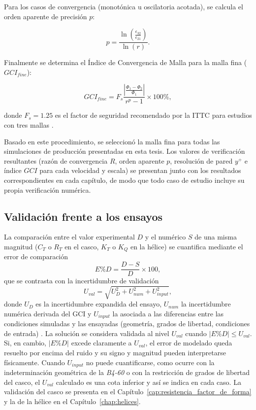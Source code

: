Para los casos de convergencia (monotónica u oscilatoria acotada), se calcula el orden aparente de precisión $p$:

\begin{equation}
    p = \frac{\ln \left( \frac{\epsilon_{32}}{\epsilon_{21}} \right)}{\ln(r)}.
\end{equation}

Finalmente se determina el Índice de Convergencia de Malla para la malla fina ($GCI_{fine}$):

\begin{equation}
    GCI_{fine} = F_s \frac{ \left| \frac{\Phi_{1} - \Phi_{2}}{\Phi_{1}} \right| }{r^p - 1} \times 100 \%,
\end{equation}

donde $F_s = 1.25$ es el factor de seguridad recomendado por la ITTC
para estudios con tres mallas \citep{ITTC_uncertainty_CFD}.

Basado en este procedimiento, se seleccionó la malla fina para todas
las simulaciones de producción presentadas en esta tesis. Los valores de
verificación resultantes (razón de convergencia $R$, orden aparente $p$,
resolución de pared $y^+$ e índice $GCI$ para cada velocidad y escala) se
presentan junto con los resultados correspondientes en cada capítulo, de modo
que todo caso de estudio incluye su propia verificación numérica.

\subsection{Validación frente a los ensayos}
\label{sec:validacion_general}

La comparación entre el valor experimental $D$ y el numérico $S$ de una misma magnitud ($C_T$ o $R_T$ en el casco, $K_T$ o $K_Q$ en la hélice) se cuantifica mediante el error de comparación
%
\begin{equation}
    E\%D = \frac{D - S}{D}\times 100,
    \label{eq:error_comparacion}
\end{equation}
%
que se contrasta con la incertidumbre de validación
%
\begin{equation}
    U_{val} = \sqrt{U_D^2 + U_{num}^2 + U_{input}^2},
    \label{eq:u_val}
\end{equation}
%
donde $U_D$ es la incertidumbre expandida del ensayo, $U_{num}$ la incertidumbre numérica derivada del GCI y $U_{input}$ la asociada a las diferencias entre las condiciones simuladas y las ensayadas (geometría, grados de libertad, condiciones de entrada) \citep{ITTC_uncertainty_CFD}. La solución se considera validada al nivel $U_{val}$ cuando $|E\%D| \le U_{val}$. Si, en cambio, $|E\%D|$ excede claramente a $U_{val}$, el error de modelado queda resuelto por encima del ruido y su signo y magnitud pueden interpretarse físicamente. Cuando $U_{input}$ no puede cuantificarse, como ocurre con la indeterminación geométrica de la \textit{B4-60} o con la restricción de grados de libertad del casco, el $U_{val}$ calculado es una cota inferior y así se indica en cada caso. La validación del casco se presenta en el Capítulo~\ref{cap:resistencia_factor_de_forma} y la de la hélice en el Capítulo~\ref{chap:helices}.
